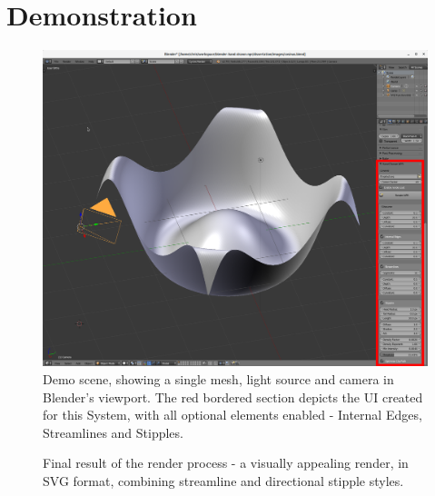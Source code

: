 \FloatBarrier
\section{Demonstration}\label{impl_demo}

\begin{figure}[h!]
	\centering
	\includegraphics[width=\textwidth]{images/demo_blender.png}
	\caption{Demo scene, showing a single mesh, light source and camera in Blender's viewport. The red bordered section depicts the UI created for this System, with all optional elements enabled - Internal Edges, Streamlines and Stipples.}\label{demo_blender}
\end{figure}

\begin{figure}[h!]
	\centering
	
	\caption{Final result of the render process - a visually appealing render, in SVG format, combining streamline and directional stipple styles.}\label{demo_result}
\end{figure}